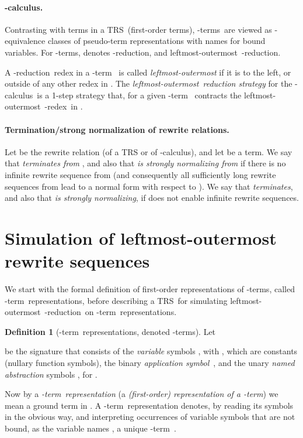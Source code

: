 \documentclass[
submission
]{dmtcs-episciences-tampered}
\newcommand{\nb}{\nobreakdash}
\newcommand{\TRS}{TRS}
\newcommand{\lambdacalculus}{\nb-cal\-cu\-lus}
\newcommand{\lambdaterm}{\nb-term}
\newcommand{\lambdaterms}{\lambdaterm{s}}
\newcommand{\betareduction}{\nb-re\-duc\-tion}
\newcommand{\betaredex}{\nb-re\-dex}
\newcommand{\lo}{left\-most-outer\-most}
\theoremstyle{plain}
\theoremstyle{definition}
\newtheorem{definition}[theorem]{Definition}
\begin{document}
\paragraph{-calculus.}
  Contrasting with terms in a \TRS\ (first-order terms), 
  \lambdaterms\ are viewed as \nb-equivalence classes of pseudo-term representations with names for bound variables.
  For \lambdaterms,  denotes \betareduction, and  \lo\ \betareduction.

  A \betareduction\ redex in a \lambdaterm~ is called \emph{\lo} if it is to the left, or outside of any other redex in .
  The \emph{\lo\ reduction strategy} for the \lambdacalculus\ is a 1-step strategy that,
  for a given \lambdaterm~ contracts the \lo\ \betaredex\ in .



\paragraph{Termination/strong normalization of rewrite relations.} 
  Let  be the rewrite relation (of a TRS or of \lambdacalculus), and let  be a term.  
  We say that  \emph{terminates from }, 
     and also that \emph{ is strongly normalizing from }
  if there is no infinite rewrite sequence from 
  (and consequently all sufficiently long rewrite sequences from  lead to a normal form with respect to ). 
  We say that  \emph{terminates}, and also that \emph{is strongly normalizing}, if  does not enable infinite rewrite sequences.
    




\section{Simulation of leftmost-outermost rewrite sequences}
  \label{sec:lo-simulation}


We start with the formal definition of first-order representations of \lambdaterms,
called \lambdaterm\ representations,
before describing a \TRS\ for simulating \lo\ \betareduction\ on \lambdaterm\ representations.

\begin{definition}[\lambdaterm\ representations, denoted \lambdaterms]\label{def:ltermrep}
  Let

be the signature that
  consists of the \emph{variable} symbols , with , which are constants (nullary function symbols),
  the binary \emph{application symbol}~,
  and the unary \emph{named abstraction} symbols , for .
  
  Now by a \emph{\lambdaterm\ representation} (a \emph{(first-order) representation of a \lambdaterm})
  we mean a ground term in . 
  A \lambdaterm\ representation  denotes, by reading its symbols in the obvious way,
  and interpreting occurrences of variable symbols  that are not bound,
  as the variable names , a unique \lambdaterm\ .
  
  
  
  
  
  
\end{definition}
\end{document}
